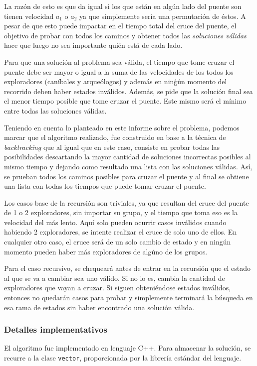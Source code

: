         La razón de esto es que da igual si los que están en algún lado del puente son tienen velocidad $a_1$ o $a_2$ ya que simplemente sería una permutación de éstos. A pesar de que esto puede impactar en el tiempo total del cruce del puente, el objetivo de probar con todos los caminos y obtener todos las \emph{soluciones válidas} hace que luego no sea importante quién está de cada lado.

        Para que una solución al problema sea válida, el tiempo que tome cruzar el puente debe ser mayor o igual a la suma de las velocidades de los todos los exploradores (caníbales y arqueólogos) y además en ninǵún momento del recorrido deben haber estados inválidos. Además, se pide que la solución final sea el menor tiempo posible que tome cruzar el puente. Este mismo será el mínimo entre todas las soluciones válidas.

        Teniendo en cuenta lo planteado en este informe sobre el problema, podemos marcar que el algoritmo realizado, fue construido en base a la técnica de \emph{backtracking} que al igual que en este caso, consiste en probar todas las posibilidades descartando la mayor cantidad de soluciones incorrectas posibles al mismo tiempo y dejando como resultado una lista con las soluciones válidas. Así, se prueban todos los caminos posibles para cruzar el puente y al final se obtiene una lista con todas los tiempos que puede tomar cruzar el puente.

        Los casos base de la recursión son triviales, ya que resultan del cruce del puente de 1 o 2 exploradores, sin importar su grupo, y el tiempo que toma eso es la velocidad del más lento. Aquí solo pueden ocurrir casos inválidos cuando habiendo 2 exploradores, se intente realizar el cruce de solo uno de ellos. En cualquier otro caso, el cruce será de un solo cambio de estado y en ningún momento pueden haber más exploradores de algúno de los grupos.

        Para el caso recursivo, se chequeará antes de entrar en la recursión que el estado al que se va a cambiar sea uno válido. Si no lo es, cambia la cantidad de exploradores que vayan a cruzar. Si siguen obteniéndose estados inválidos, entonces no quedarán casos para probar y simplemente terminará la búsqueda en esa rama de estados sin haber encontrado una solución válida.

        \subsubsection{Detalles implementativos}
            El algoritmo fue implementado en lenguaje C++. Para almacenar la solución, se recurre a la clase \texttt{vector}, proporcionada por la librería estándar del lenguaje.

